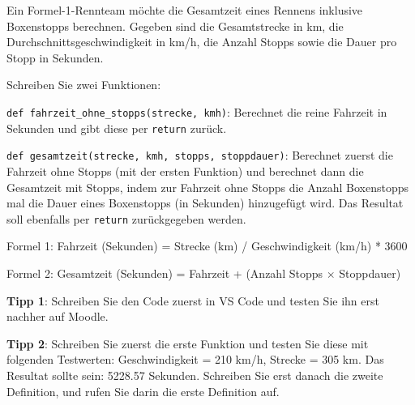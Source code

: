 \begin{myexercise}
	Ein Formel-1-Rennteam möchte die Gesamtzeit eines Rennens inklusive Boxenstopps berechnen. Gegeben sind die Gesamtstrecke in km, die Durchschnittsgeschwindigkeit in km/h, die Anzahl Stopps sowie die Dauer pro Stopp in Sekunden.

	Schreiben Sie zwei Funktionen:

	\lstinline|def fahrzeit_ohne_stopps(strecke, kmh)|: Berechnet die reine Fahrzeit in Sekunden und gibt diese per \lstinline|return| zurück.

	\lstinline|def gesamtzeit(strecke, kmh, stopps, stoppdauer)|: Berechnet zuerst die Fahrzeit ohne Stopps (mit der ersten Funktion) und berechnet dann die Gesamtzeit mit Stopps, indem zur Fahrzeit ohne Stopps die Anzahl Boxenstopps mal die Dauer eines Boxenstopps (in Sekunden) hinzugefügt wird. Das Resultat soll ebenfalls per \lstinline|return| zurückgegeben werden.

	Formel 1: Fahrzeit (Sekunden) = Strecke (km) / Geschwindigkeit (km/h) * 3600

	Formel 2: Gesamtzeit (Sekunden) = Fahrzeit + (Anzahl Stopps $\times$ Stoppdauer)

	\textbf{Tipp 1}: Schreiben Sie den Code zuerst in VS Code und testen Sie ihn erst nachher auf Moodle.

	\textbf{Tipp 2}: Schreiben Sie zuerst die erste Funktion und testen Sie diese mit folgenden Testwerten: Geschwindigkeit = 210 km/h, Strecke = 305 km. Das Resultat sollte sein: 5228.57 Sekunden. Schreiben Sie erst danach die zweite Definition, und rufen Sie darin die erste Definition auf.

	\begin{myanswer}
		
	\end{myanswer}
\end{myexercise}


